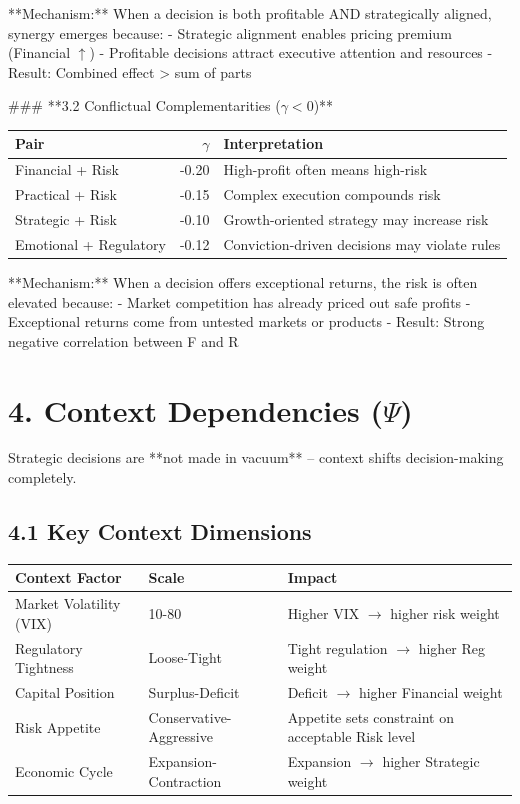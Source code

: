 \documentclass[11pt]{article}
\begin{document}
**Mechanism:** When a decision is both profitable AND strategically aligned, synergy emerges because:
- Strategic alignment enables pricing premium (Financial $\uparrow$)
- Profitable decisions attract executive attention and resources
- Result: Combined effect > sum of parts

### **3.2 Conflictual Complementarities ($\gamma < 0$)**

\begin{table}[h]
\centering
\begin{tabular}{|l|r|l|}
\hline
\textbf{Pair} & $\gamma$ & \textbf{Interpretation} \\
\hline
Financial + Risk & -0.20 & High-profit often means high-risk \\
Practical + Risk & -0.15 & Complex execution compounds risk \\
Strategic + Risk & -0.10 & Growth-oriented strategy may increase risk \\
Emotional + Regulatory & -0.12 & Conviction-driven decisions may violate rules \\
\hline
\end{tabular}
\end{table}

**Mechanism:** When a decision offers exceptional returns, the risk is often elevated because:
- Market competition has already priced out safe profits
- Exceptional returns come from untested markets or products
- Result: Strong negative correlation between F and R

\section{4. Context Dependencies ($\Psi$)}

Strategic decisions are **not made in vacuum** – context shifts decision-making completely.

\subsection{4.1 Key Context Dimensions}

\begin{table}[h]
\centering
\begin{tabular}{|l|l|l|}
\hline
\textbf{Context Factor} & \textbf{Scale} & \textbf{Impact} \\
\hline
Market Volatility (VIX) & 10-80 & Higher VIX $\rightarrow$ higher risk weight \\
Regulatory Tightness & Loose-Tight & Tight regulation $\rightarrow$ higher Reg weight \\
Capital Position & Surplus-Deficit & Deficit $\rightarrow$ higher Financial weight \\
Risk Appetite & Conservative-Aggressive & Appetite sets constraint on acceptable Risk level \\
Economic Cycle & Expansion-Contraction & Expansion $\rightarrow$ higher Strategic weight \\
\hline
\end{tabular}
\end{table}
\end{document}
